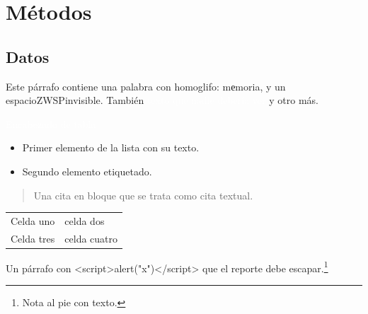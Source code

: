 \chapter{Métodos}
\section{Datos}

Este párrafo contiene una palabra con homoglifo: mеmoria, y un espacio{{ZWSP}}invisible.
También \textcolor{white}{texto que nadie debería ver} y \textcolor{fantasma}{otro más}.
\begin{table}[H]
\textcolor{white}{Encabezado de tabla}
\end{table}

\begin{itemize}
\item Primer elemento de la lista con su texto.
\item[b)] Segundo elemento etiquetado.
\end{itemize}

\begin{quote}
Una cita en bloque que se trata como cita textual.
\end{quote}

\begin{tabular}{ll}
Celda uno & celda dos \\
Celda tres & celda cuatro \\
\end{tabular}

Un párrafo con <script>alert("x")</script> que el reporte debe escapar.\footnote{Nota al pie
con texto.}
